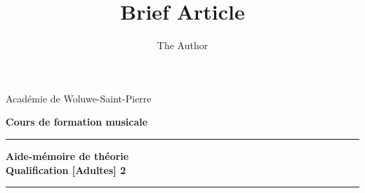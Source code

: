 \documentclass[11pt]{scrreprt}
\title{Brief Article}
\author{The Author}
\begin{document}
\thispagestyle{empty}
\begin{center}
\begin{LARGE}
Académie de Woluwe-Saint-Pierre
\end{LARGE}
\end{center}

\begin{center}
\begin{LARGE}
\textbf{Cours de formation musicale}
\end{LARGE}
\end{center}

\begin{center}
\vspace{5cm}
\noindent\rule{\textwidth}{0.5mm}
\begin{huge}
\textbf{Aide-mémoire de théorie \\
\vspace{2 cm}
 Qualification [Adultes] 2}
\end{huge}
\noindent\rule{\textwidth}{0.5mm}
\end{center}



\end{document}
